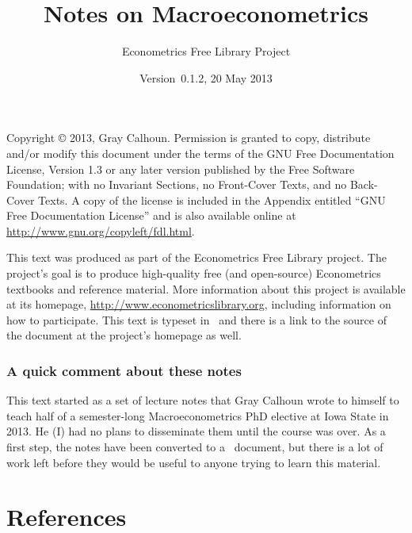 \documentclass[nofonts]{tufte-latex/tufte-handout}
\title{Notes on Macroeconometrics}
\author{Econometrics Free Library Project}
\date{Version~0.1.2, 20 May 2013}
\begin{document}
\maketitle

\bigskip\noindent%
Copyright © 2013, Gray Calhoun.  Permission is granted to copy,
distribute and/or modify this document under the terms of the GNU Free
Documentation License, Version 1.3 or any later version published by
the Free Software Foundation; with no Invariant Sections, no
Front-Cover Texts, and no Back-Cover Texts.  A copy of the license is
included in the Appendix entitled ``GNU Free Documentation License''
and is also available online at
\url{http://www.gnu.org/copyleft/fdl.html}.

This text was produced as part of the Econometrics Free Library
project.  The project's goal is to produce high-quality free (and
open-source) Econometrics textbooks and reference material.  More
information about this project is available at its homepage,
\url{http://www.econometricslibrary.org}, including information on how
to participate.  This text is typeset in \XeLaTeX\ and there is a link
to the source of the document at the project's homepage as well.

\tableofcontents

\section{A quick comment about these notes}
This text started as a set of lecture notes that Gray Calhoun wrote to
himself to teach half of a semester-long Macroeconometrics PhD
elective at Iowa State in 2013.  He (I) had no plans to disseminate
them until the course was over.  As a first step, the notes have been
converted to a \XeLaTeX\ document, but there is a lot of work left
before they would be useful to anyone trying to learn this material.






\appendix


\part*{References}


\end{document}
